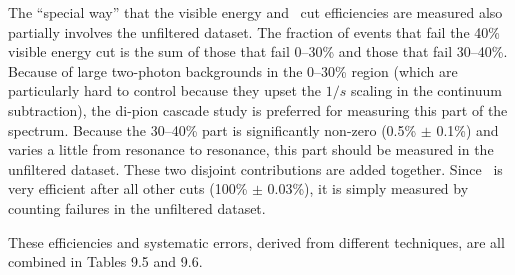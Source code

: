 \documentclass[12pt]{article}
\begin{document}
The ``special way'' that the visible energy and \lfourdec\ cut
efficiencies are measured also partially involves the unfiltered
dataset.  The fraction of events that fail the 40\% visible energy cut
is the sum of those that fail 0--30\% and those that fail 30--40\%.
Because of large two-photon backgrounds in the 0--30\% region (which
are particularly hard to control because they upset the $1/s$ scaling
in the continuum subtraction), the di-pion cascade study is preferred
for measuring this part of the spectrum.  Because the 30--40\% part is
significantly non-zero (0.5\% $\pm$ 0.1\%) and varies a little from
resonance to resonance, this part should be measured in the unfiltered
dataset.  These two disjoint contributions are added together.  Since
\lfourdec\ is very efficient after all other cuts (100\% $\pm$
0.03\%), it is simply measured by counting failures in the unfiltered
dataset.

These efficiencies and systematic errors, derived from different
techniques, are all combined in Tables 9.5 and 9.6.
\end{document}
